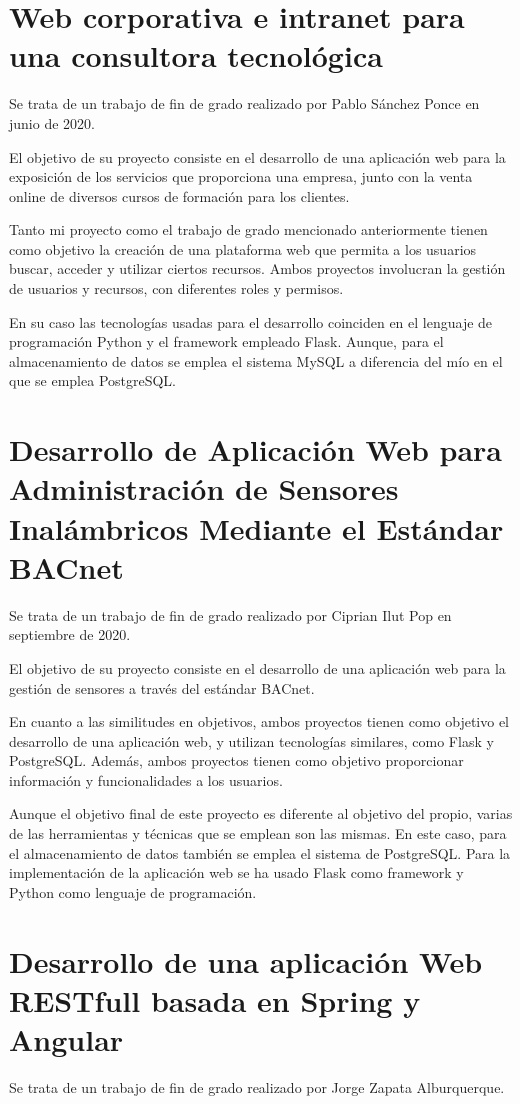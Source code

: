 \section{Web corporativa e intranet para una consultora tecnológica}
\cite{ponce_web_2020} Se trata de un trabajo de fin de grado realizado por Pablo Sánchez Ponce en junio de 2020.

El objetivo de su proyecto consiste en el desarrollo de una aplicación web para la exposición de los servicios que proporciona una empresa, junto con la venta online de diversos cursos de formación para los clientes. 

Tanto mi proyecto como el trabajo de grado mencionado anteriormente tienen como objetivo la creación de una plataforma web que permita a los usuarios buscar, acceder y utilizar ciertos recursos. Ambos proyectos involucran la gestión de usuarios y recursos, con diferentes roles y permisos.

En su caso las tecnologías usadas para el desarrollo coinciden en el lenguaje de programación Python y el framework empleado Flask. Aunque, para el almacenamiento de datos se emplea el sistema MySQL a diferencia del mío en el que se emplea PostgreSQL.

\section{Desarrollo de Aplicación Web para Administración de Sensores Inalámbricos Mediante el Estándar BACnet}
\cite{pop_desarrollo_2020} Se trata de un trabajo de fin de grado realizado por Ciprian Ilut Pop en septiembre de 2020.

El objetivo de su proyecto consiste en el desarrollo de una aplicación web para la gestión de sensores a través del estándar BACnet.

En cuanto a las similitudes en objetivos, ambos proyectos tienen como objetivo el desarrollo de una aplicación web, y utilizan tecnologías similares, como Flask y PostgreSQL. Además, ambos proyectos tienen como objetivo proporcionar información y funcionalidades a los usuarios. 

Aunque el objetivo final de este proyecto es diferente al objetivo del propio, varias de las herramientas y técnicas que se emplean son las mismas. En este caso, para el almacenamiento de datos también se emplea el sistema de PostgreSQL. Para la implementación de la aplicación web se ha usado Flask como framework y Python como lenguaje de programación.

\section{Desarrollo de una aplicación Web RESTfull basada en Spring y Angular}
\cite{RESTfull_Jorge} Se trata de un trabajo de fin de grado realizado por Jorge Zapata Alburquerque.

